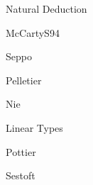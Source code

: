 \begin{pgroup}{Natural Deduction}
  \begin{paper}{McCartyS94}
    \mustread
  \end{paper}

  \begin{paper}{Seppo}
    \mustread
  \end{paper}

  \begin{paper}{Pelletier}
    \mustread
  \end{paper}

  \begin{paper}{Nie}
    \mustread
  \end{paper}
\end{pgroup}

\begin{pgroup}{Linear Types}
  \begin{paper}{Pottier}
    \mustread
  \end{paper}

  \begin{paper}{Sestoft}
    \mustread
  \end{paper}
\end{pgroup}
